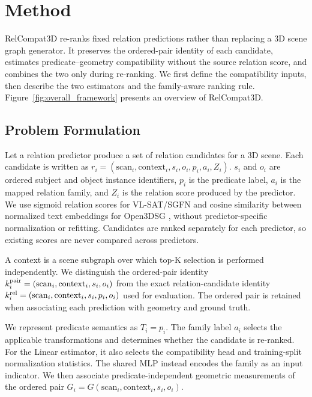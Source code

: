 \section{Method}

RelCompat3D re-ranks fixed relation predictions rather than replacing a 3D scene graph generator. It preserves the ordered-pair identity of each candidate, estimates predicate--geometry compatibility without the source relation score, and combines the two only during re-ranking. We first define the compatibility inputs, then describe the two estimators and the family-aware ranking rule. Figure~\ref{fig:overall_framework} presents an overview of RelCompat3D.

\subsection{Problem Formulation}
Let a relation predictor produce a set of relation candidates for a 3D scene. Each candidate is written as $r_i=(\mathrm{scan}_i,\mathrm{context}_i,s_i,o_i,p_i,a_i,Z_i)$.
$s_i$ and $o_i$ are ordered subject and object instance identifiers, $p_i$ is the predicate label, $a_i$ is the mapped relation family, and $Z_i$ is the relation score produced by the predictor. We use sigmoid relation scores for VL-SAT/SGFN and cosine similarity between normalized text embeddings for Open3DSG \cite{wang2023vl,wu2021scenegraphfusion,koch2024open3dsg}, without predictor-specific normalization or refitting. Candidates are ranked separately for each predictor, so existing scores are never compared across predictors. 

A context is a scene subgraph over which top-K selection is performed independently. We distinguish the ordered-pair identity $k^{\rm pair}_i = (\mathrm{scan}_i, \mathrm{context}_i, s_i, o_i)$ from the exact relation-candidate identity $k^{\rm rel}_i = (\mathrm{scan}_i, \mathrm{context}_i, s_i, p_i, o_i)$ used for evaluation. The ordered pair is retained when associating each prediction with geometry and ground truth. 

We represent predicate semantics as $T_i=p_i$. The family label $a_i$ selects the applicable transformations and determines whether the candidate is re-ranked. For the Linear estimator, it also selects the compatibility head and training-split normalization statistics. The shared MLP instead encodes the family as an input indicator. We then associate predicate-independent geometric measurements of the ordered pair $G_i=G(\mathrm{scan}_i,\mathrm{context}_i,s_i,o_i)$.

